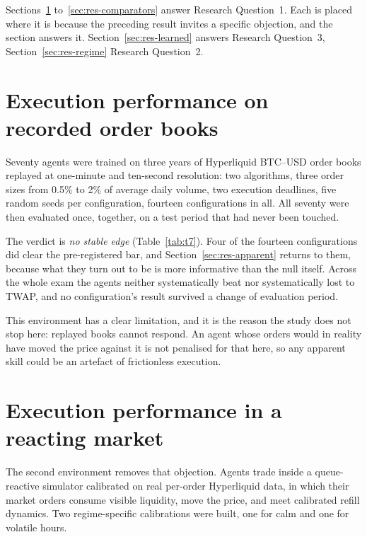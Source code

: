 Sections~\ref{sec:res-replay} to~\ref{sec:res-comparators} answer Research Question~1. Each is
placed where it is because the preceding result invites a specific objection, and the
section answers it. Section~\ref{sec:res-learned} answers Research Question~3,
Section~\ref{sec:res-regime} Research Question~2.

\section{Execution performance on recorded order books}\label{sec:res-replay}

Seventy agents were trained on three years of Hyperliquid BTC--USD order books replayed at
one-minute and ten-second resolution: two algorithms, three order sizes from 0.5\% to 2\% of
average daily volume, two execution deadlines, five random seeds per configuration,
fourteen configurations in all. All seventy were then evaluated once, together, on a test
period that had never been touched.

The verdict is \emph{no stable edge} (Table~\ref{tab:t7}). Four of the fourteen
configurations did clear the
pre-registered bar, and Section~\ref{sec:res-apparent} returns to them, because what they
turn out to be is more informative than the null itself. Across the whole exam the agents
neither systematically beat nor systematically lost to TWAP, and no configuration's result
survived a change of evaluation period.

This environment has a clear limitation, and it is the reason the study does not stop here:
replayed books cannot respond. An agent whose orders would in reality have moved the price
against it is not penalised for that here, so any apparent skill could be an artefact of
frictionless execution.

\section{Execution performance in a reacting market}\label{sec:res-reactive}

The second environment removes that objection. Agents trade inside a queue-reactive
simulator calibrated on real per-order Hyperliquid data, in which their market orders
consume visible liquidity, move the price, and meet calibrated refill dynamics. Two
regime-specific calibrations were built, one for calm and one for volatile hours.

